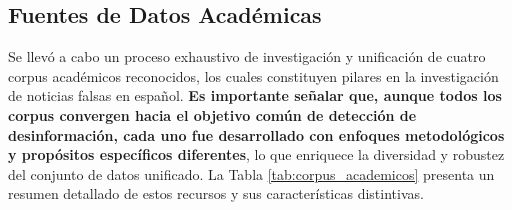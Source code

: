 
\subsection{Fuentes de Datos Académicas}

Se llevó a cabo un proceso exhaustivo de investigación y unificación de cuatro corpus académicos reconocidos, los cuales constituyen pilares en la investigación de noticias falsas en español. \textbf{Es importante señalar que, aunque todos los corpus convergen hacia el objetivo común de detección de desinformación, cada uno fue desarrollado con enfoques metodológicos y propósitos específicos diferentes}, lo que enriquece la diversidad y robustez del conjunto de datos unificado. La Tabla \ref{tab:corpus_academicos} presenta un resumen detallado de estos recursos y sus características distintivas.

